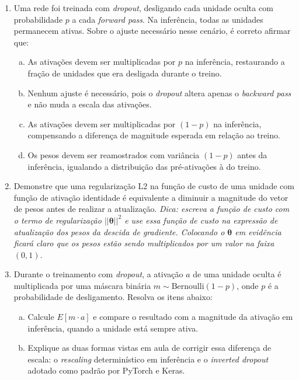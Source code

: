 \documentclass{dlproblemset}
\begin{document}
\begin{enumerate}[1)]
    \item Uma rede foi treinada com \textit{dropout}, desligando cada unidade oculta com probabilidade $p$ a cada \textit{forward pass}. Na inferência, todas as unidades permanecem ativas. Sobre o ajuste necessário nesse cenário, é correto afirmar que:
    \begin{enumerate}[(a)]
        \item As ativações devem ser multiplicadas por $p$ na inferência, restaurando a fração de unidades que era desligada durante o treino.
        \item Nenhum ajuste é necessário, pois o \textit{dropout} altera apenas o \textit{backward pass} e não muda a escala das ativações.
        \item As ativações devem ser multiplicadas por $(1-p)$ na inferência, compensando a diferença de magnitude esperada em relação ao treino.
        \item Os pesos devem ser reamostrados com variância $(1-p)$ antes da inferência, igualando a distribuição das pré-ativações à do treino.
    \end{enumerate}

    \item Demonstre que uma regularização L2 na função de custo de uma unidade com função de ativação identidade é equivalente a diminuir a magnitude do vetor de pesos antes de realizar a atualização. \textit{Dica: escreva a função de custo com o termo de regularização $||\boldsymbol{\theta}||^2$ e use essa função de custo na expressão de atualização dos pesos da descida de gradiente. Colocando o $\boldsymbol{\theta}$ em evidência ficará claro que os pesos estão sendo multiplicados por um valor na faixa $(0,1)$.}

    \item Durante o treinamento com \textit{dropout}, a ativação $a$ de uma unidade oculta é multiplicada por uma máscara binária $m \sim \text{Bernoulli}(1-p)$, onde $p$ é a probabilidade de desligamento. Resolva os itens abaixo:
    \begin{enumerate}[a)]
        \item Calcule $E[m \cdot a]$ e compare o resultado com a magnitude da ativação em inferência, quando a unidade está sempre ativa.
        \item Explique as duas formas vistas em aula de corrigir essa diferença de escala: o \textit{rescaling} determinístico em inferência e o \textit{inverted dropout} adotado como padrão por PyTorch e Keras.
    \end{enumerate}


\end{enumerate}
\end{document}
